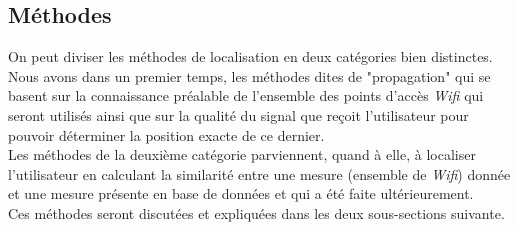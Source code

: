 \documentclass[11pt,journal,compsoc]{IEEEtran}
\begin{document}
  \subsection{Méthodes}
    On peut diviser les méthodes de localisation en deux catégories bien distinctes.\\
    Nous avons dans un premier temps, les méthodes dites de "propagation" qui se basent sur la connaissance préalable de l'ensemble des points d'accès \textit{Wifi} qui seront utilisés ainsi que sur la qualité du signal que reçoit l'utilisateur pour pouvoir déterminer la position exacte de ce dernier.\\
    Les méthodes de la deuxième catégorie parviennent, quand à elle, à localiser l'utilisateur en calculant la similarité entre une mesure (ensemble de \textit{Wifi}) donnée et une mesure présente en base de données et qui a été faite ultérieurement.\\
    Ces méthodes seront discutées et expliquées dans les deux sous-sections suivante.
\end{document}
